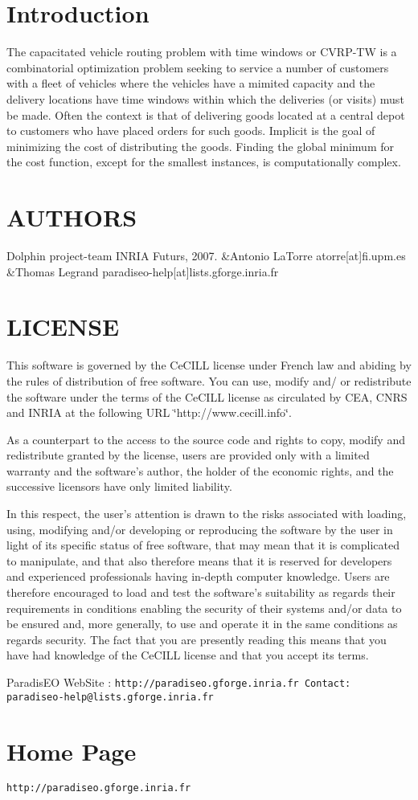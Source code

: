 \section{Introduction}\label{main_Introduction}
The capacitated vehicle routing problem with time windows or CVRP-TW is a combinatorial optimization problem seeking to service a number of customers with a fleet of vehicles where the vehicles have a mimited capacity and the delivery locations have time windows within which the deliveries (or visits) must be made. Often the context is that of delivering goods located at a central depot to customers who have placed orders for such goods. Implicit is the goal of minimizing the cost of distributing the goods. Finding the global minimum for the cost function, except for the smallest instances, is computationally complex.\section{AUTHORS}\label{main_authors}
\begin{TabularC}{3}
\hline
Dolphin project-team INRIA Futurs, 2007. &Antonio La\-Torre atorre[at]fi.upm.es &Thomas Legrand paradiseo-help[at]lists.gforge.inria.fr  \\\hline
\end{TabularC}
\section{LICENSE}\label{main_LICENSE}
This software is governed by the Ce\-CILL license under French law and abiding by the rules of distribution of free software. You can use, modify and/ or redistribute the software under the terms of the Ce\-CILL license as circulated by CEA, CNRS and INRIA at the following URL \char`\"{}http://www.cecill.info\char`\"{}.

As a counterpart to the access to the source code and rights to copy, modify and redistribute granted by the license, users are provided only with a limited warranty and the software's author, the holder of the economic rights, and the successive licensors have only limited liability.

In this respect, the user's attention is drawn to the risks associated with loading, using, modifying and/or developing or reproducing the software by the user in light of its specific status of free software, that may mean that it is complicated to manipulate, and that also therefore means that it is reserved for developers and experienced professionals having in-depth computer knowledge. Users are therefore encouraged to load and test the software's suitability as regards their requirements in conditions enabling the security of their systems and/or data to be ensured and, more generally, to use and operate it in the same conditions as regards security. The fact that you are presently reading this means that you have had knowledge of the Ce\-CILL license and that you accept its terms.

Paradis\-EO Web\-Site : \tt{http://paradiseo.gforge.inria.fr} Contact: \tt{paradiseo-help@lists.gforge.inria.fr}\section{Home Page}\label{main_Paradiseo}
{\tt http://paradiseo.gforge.inria.fr} 
